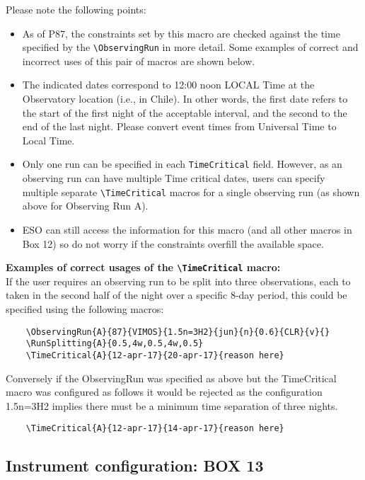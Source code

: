 \documentclass{article}
\begin{document}
Please note the following points:
\begin{itemize}
\item As of P87, the constraints set by this macro are checked against the
time specified by the \verb|\ObservingRun| in more detail.
Some examples of correct and incorrect uses of this pair of macros are shown below.
\item The indicated dates correspond to 12:00 noon LOCAL Time at
the Observatory location (i.e., in Chile). In other words, the first
date refers to the start of the first night of the acceptable
interval, and the second to the end of the last night. Please 
convert event times from Universal Time to Local Time.
\item Only one run can be specified in each \verb|TimeCritical| field. 
However, as an observing run can have multiple Time critical dates, users
can specify multiple separate \verb|\TimeCritical| macros for a single observing run (as shown above
for Observing Run A).
\item ESO can still access the information for this macro (and all other macros in Box 12) so
do not worry if the constraints overfill the available space.
\end{itemize}

{\bf Examples of correct usages of the \verb|\TimeCritical| macro: }\\
If the user requires an observing run to be split into three observations, each to taken in the 
second half of the night over a specific 8-day period, this could be specified using the following macros:
\begin{verbatim}
    \ObservingRun{A}{87}{VIMOS}{1.5n=3H2}{jun}{n}{0.6}{CLR}{v}{}
    \RunSplitting{A}{0.5,4w,0.5,4w,0.5}
    \TimeCritical{A}{12-apr-17}{20-apr-17}{reason here}
\end{verbatim}

Conversely if the ObservingRun was specified as above but the TimeCritical macro was configured as follows
it would be rejected as the configuration 1.5n=3H2 implies there must be a minimum time separation of
three nights.
\begin{verbatim}
    \TimeCritical{A}{12-apr-17}{14-apr-17}{reason here}
\end{verbatim}








\subsection{Instrument configuration: {\bf BOX 13}}
\end{document}

